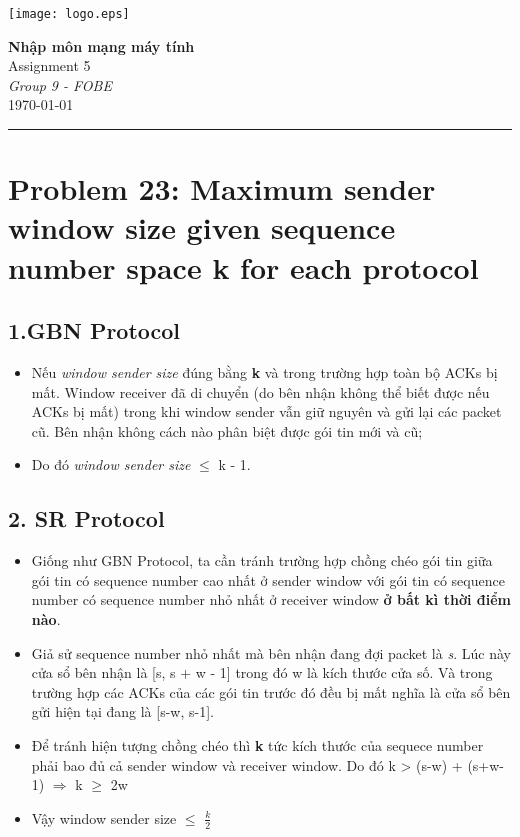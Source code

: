 \documentclass[12pt,a4paper]{article}
\begin{document}
\textcolor{UM_Brown}{
\begin{minipage}{0.1\textwidth}
    \begin{flushleft}
        \texttt{[image: logo.eps]}
    \end{flushleft}
\end{minipage}
\begin{minipage}{0.8\textwidth}
    \begin{center}
        \textbf{\Large Nhập môn mạng máy tính}\\
        \vspace{5pt}
        Assignment 5 \\
        \vspace{10pt}
        \textit{Group 9 - FOBE} \\
        \vspace{5pt}
        \longdate\today
    \end{center}
\end{minipage}
\vspace{10pt}
\hrule
}

\section*{Problem 23: Maximum sender window size given sequence number space k for each protocol}
\subsection*{1.\;GBN Protocol}
\begin{itemize}
    \item Nếu \textit{window sender size} đúng bằng \textbf{k} và trong trường hợp toàn bộ ACKs bị mất. Window receiver đã di chuyển (do bên nhận không thể biết được nếu ACKs bị mất) trong
khi window sender vẫn giữ nguyên và gửi lại các packet cũ. Bên nhận không cách nào phân biệt được gói tin mới và cũ;
    \item Do đó \textit{window sender size} $\le$ k - 1.
\end{itemize}

\subsection*{2.\; SR Protocol}
\begin{itemize}
    \item Giống như GBN Protocol, ta cần tránh trường hợp chồng chéo gói tin giữa gói tin có sequence number cao nhất ở sender window với gói
tin có sequence number có sequence number nhỏ nhất ở receiver window \textbf{ở bất kì thời điểm nào}.
    \item Giả sử sequence number nhỏ nhất mà bên nhận đang đợi packet là \textit{s}. Lúc này cửa sổ bên nhận là [s, s + w - 1] trong đó w là kích thước cửa số. Và trong trường
hợp các ACKs của các gói tin trước đó đều bị mất nghĩa là cửa sổ bên gửi hiện tại đang là [s-w, s-1].
    \item Để tránh hiện tượng chồng chéo thì \textbf{k} tức kích thước của sequece number phải bao đủ cả sender window và receiver window. Do đó k > (s-w) + (s+w-1) $\Rightarrow$ k $\ge$ 2w
    \item Vậy window sender size $\le$ $\frac{k}{2}$
\end{itemize}
\end{document}
